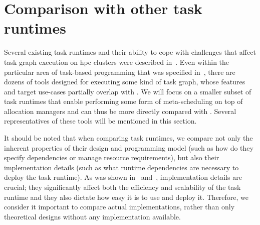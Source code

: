 \section{Comparison with other task runtimes}
\label{hq:related-work}
Several existing task runtimes and their ability to cope
with challenges that affect task graph execution on \gls{hpc} clusters were described
in~. Even within the particular area of task-based programming that was specified
in~, there are dozens of tools designed for executing some kind of task
graph, whose features and target use-cases partially overlap with \hyperqueue{}. We will
focus on a smaller subset of task runtimes that enable performing some form of meta-scheduling on
top of allocation managers and can thus be more directly compared with \hyperqueue{}.
Several representatives of these tools will be mentioned in this section.

It should be noted that when comparing task runtimes, we compare not only the inherent properties
of their design and programming model (such as how do they specify dependencies or manage resource
requirements), but also their implementation details (such as what runtime dependencies are
necessary to deploy the task runtime). As was shown in~
and~, implementation details are crucial; they significantly affect both the
efficiency and scalability of the task runtime and they also dictate how easy it is to use and
deploy it. Therefore, we consider it important to compare actual implementations, rather than only
theoretical designs without any implementation available.



